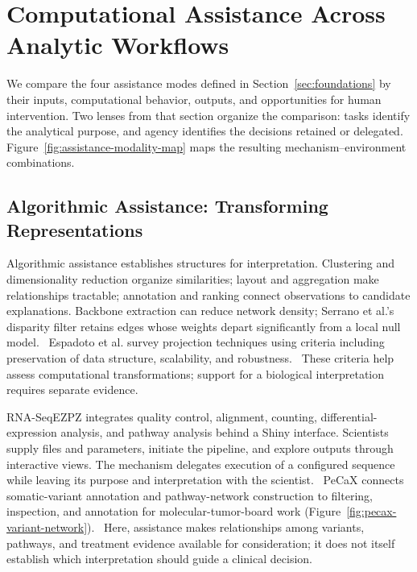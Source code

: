 \section{Computational Assistance Across Analytic Workflows}
\label{sec:assistance}

We compare the four assistance modes defined in Section~\ref{sec:foundations} by their inputs, computational behavior, outputs, and opportunities for human intervention. Two lenses from that section organize the comparison: tasks identify the analytical purpose, and agency identifies the decisions retained or delegated. Figure~\ref{fig:assistance-modality-map} maps the resulting mechanism--environment combinations.

\subsection{Algorithmic Assistance: Transforming Representations}
\label{sec:assistance-algorithmic}

Algorithmic assistance establishes structures for interpretation. Clustering and dimensionality reduction organize similarities; layout and aggregation make relationships tractable; annotation and ranking connect observations to candidate explanations. Backbone extraction can reduce network density; Serrano et al.'s disparity filter retains edges whose weights depart significantly from a local null model.~\cite{Serrano2009Backbone} Espadoto et al. survey projection techniques using criteria including preservation of data structure, scalability, and robustness.~\cite{espadoto2021quantitative} These criteria help assess computational transformations; support for a biological interpretation requires separate evidence.

RNA-SeqEZPZ integrates quality control, alignment, counting, differential-expression analysis, and pathway analysis behind a Shiny interface. Scientists supply files and parameters, initiate the pipeline, and explore outputs through interactive views. The mechanism delegates execution of a configured sequence while leaving its purpose and interpretation with the scientist.~\cite{AnchorRNASeqEZPZ} PeCaX connects somatic-variant annotation and pathway-network construction to filtering, inspection, and annotation for molecular-tumor-board work (Figure~\ref{fig:pecax-variant-network}).~\cite{AnchorPeCaX} Here, assistance makes relationships among variants, pathways, and treatment evidence available for consideration; it does not itself establish which interpretation should guide a clinical decision.

